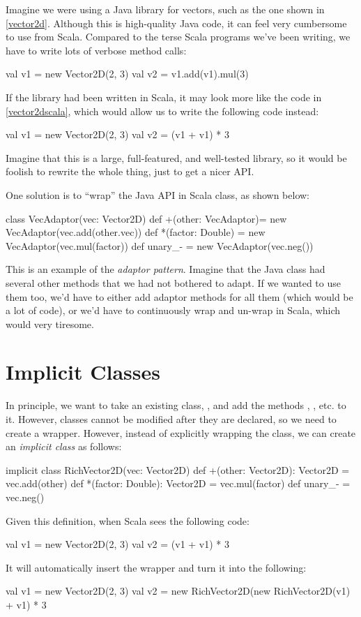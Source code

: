 \documentclass{book}
\begin{document}
Imagine we were using a Java library for vectors, such as the one shown in
\cref{vector2d}. Although this is high-quality Java code, it can feel
very cumbersome to use from Scala. Compared to the terse Scala programs
we've been writing, we have to write lots of verbose method calls:
\begin{scalacode}
val v1 = new Vector2D(2, 3)
val v2 = v1.add(v1).mul(3)
\end{scalacode}
If the library had been written in Scala, it may look more like the
code in \cref{vector2dscala}, which would allow us to write the
following code instead:
\begin{scalacode}
val v1 = new Vector2D(2, 3)
val v2 = (v1 + v1) * 3
\end{scalacode}
Imagine that this is a large, full-featured, and well-tested library, so
it would be foolish to rewrite the whole thing, just to get a nicer
API.

One solution is to ``wrap'' the Java API in Scala class, as shown below:

\begin{scalacode}
class VecAdaptor(vec: Vector2D) {
  def +(other: VecAdaptor)= new VecAdaptor(vec.add(other.vec))
  def *(factor: Double) = new VecAdaptor(vec.mul(factor))
  def unary_- = new VecAdaptor(vec.neg())
}
\end{scalacode}

This is an example of the \emph{adaptor pattern}. Imagine that
the Java class had several other methods that we had not bothered
to adapt. If we wanted to use them too, we'd have to either
add adaptor methods for all them (which would be a lot of code),
or we'd have to continuously wrap and un-wrap in Scala, which would
very tiresome.

\section{Implicit Classes}

In principle, we want to take an existing class, , and add
the methods \scalainline{+}, \scalainline{*}, etc. to  it.
 However, classes cannot be modified after they are declared, so we need to
 create a wrapper. However, instead of explicitly wrapping the class,
 we can create an \emph{implicit class} as follows:
\begin{scalacode}
implicit class RichVector2D(vec: Vector2D) {
  def +(other: Vector2D): Vector2D = vec.add(other)
  def *(factor: Double): Vector2D = vec.mul(factor)
  def unary_- = vec.neg()
}
\end{scalacode}
Given this definition, when Scala sees the following code:
\begin{scalacode}
val v1 = new Vector2D(2, 3)
val v2 = (v1 + v1) * 3
\end{scalacode}
It will automatically insert the wrapper and turn it into the following:
\begin{scalacode}
val v1 = new Vector2D(2, 3)
val v2 = new RichVector2D(new RichVector2D(v1) + v1) * 3
\end{scalacode}
\end{document}
